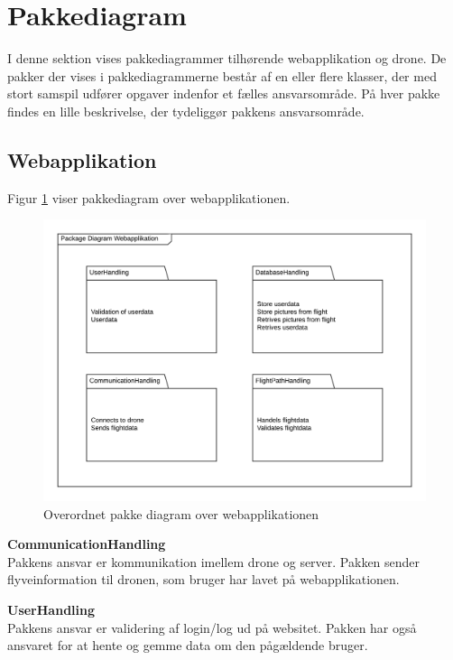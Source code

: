 \section{Pakkediagram}

I denne sektion vises pakkediagrammer tilhørende webapplikation og drone. De pakker der vises i pakkediagrammerne består af en eller flere klasser, der med stort samspil udfører opgaver indenfor et fælles ansvarsområde. På hver pakke findes en lille beskrivelse, der tydeliggør pakkens ansvarsområde.

\subsection{Webapplikation}
Figur \ref{fig:pakke_diagram_webapp} viser pakkediagram over webapplikationen. 

\vspace{-5pt}
\begin{figure}[H]
	\centering
	\includegraphics[width=1\textwidth]{Billeder/pakke_diagrammer/Gammel_server.png}
	\vspace{-1cm}
	\caption{Overordnet pakke diagram over webapplikationen}
	\label{fig:pakke_diagram_webapp}
\end{figure}

\textbf{CommunicationHandling}\\
Pakkens ansvar er kommunikation imellem drone og server. Pakken sender flyveinformation til dronen, som bruger har lavet på webapplikationen.

\textbf{UserHandling}\\
Pakkens ansvar er validering af login/log ud på websitet. Pakken har også ansvaret for at hente og gemme data om den pågældende bruger.

